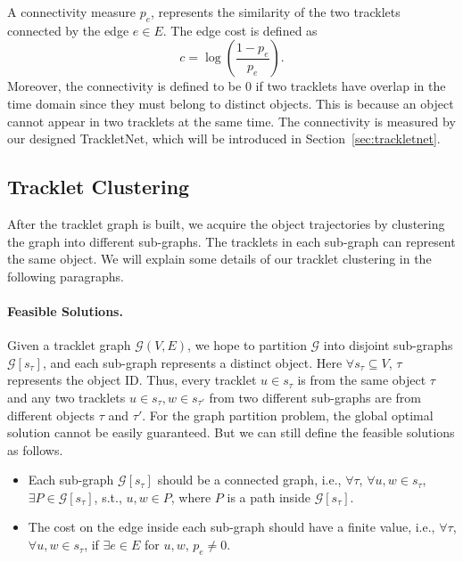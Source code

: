 \documentclass[10pt,twocolumn,letterpaper]{article}
\begin{document}
A connectivity measure $p_e$, represents the similarity of the two tracklets connected by the edge $e\in E$. The edge cost is defined as
\begin{equation}
    c = \log \left( \frac{1-p_e}{p_e} \right).
\label{eq:cost}
\end{equation}
Moreover, the connectivity is defined to be $0$ if two tracklets have overlap in the time domain since they must belong to distinct objects. This is because an object cannot appear in two tracklets at the same time. 
The connectivity is measured by our designed TrackletNet, which will be introduced in Section~\ref{sec:trackletnet}.


\subsection{Tracklet Clustering}




After the tracklet graph is built, we acquire the object trajectories by clustering the graph into different sub-graphs. The tracklets in each sub-graph can represent the same object. We will explain some details of our tracklet clustering in the following paragraphs.

\paragraph{Feasible Solutions.} 
Given a tracklet graph $\mathcal{G}(V,E)$, we hope to partition $\mathcal{G}$ into disjoint sub-graphs $\mathcal{G}[s_{\tau}]$, and each sub-graph represents a distinct object. Here $\forall s_{\tau} \subseteq V$, $\tau$ represents the object ID.
Thus, every tracklet $u \in s_{\tau}$ is from the same object $\tau$ and any two tracklets $u \in s_{\tau}, w \in s_{\tau'}$ from two different sub-graphs are from different objects $\tau$ and $\tau'$. For the graph partition problem, the global optimal solution cannot be easily guaranteed. But we can still define the feasible solutions as follows.
\begin{itemize}
\setlength\itemsep{-0.2em}
    \item Each sub-graph $\mathcal{G}[s_{\tau}]$ should be a connected graph, i.e., $\forall \tau$,  $\forall u,w \in s_{\tau}$, $\exists P\in \mathcal{G}[s_{\tau}]$, s.t., $u,w\in P$, where $P$ is a path inside $\mathcal{G}[s_{\tau}]$.
\item The cost on the edge inside each sub-graph should have a finite value, i.e., $\forall \tau$, $\forall u,w \in s_{\tau}$, if $\exists e\in E$ for $u,w$, $p_{e}\neq0$.
\end{itemize}
\end{document}
